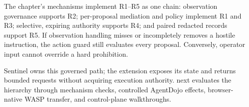 The chapter's mechanisms implement R1--R5 as one chain: observation governance
supports R2; per-proposal mediation and policy implement R1 and R3; selective,
expiring authority supports R4; and paired redacted records support R5. If
observation handling misses or incompletely removes a hostile instruction, the
action guard still evaluates every proposal. Conversely, operator input cannot
override a hard prohibition.

Sentinel owns this governed path; the extension exposes its state and returns
bounded requests without acquiring execution authority. 
next evaluates the hierarchy through mechanism checks, controlled AgentDojo
effects, browser-native WASP transfer, and control-plane walkthroughs.
